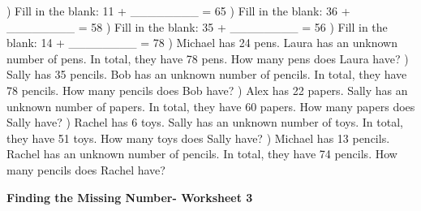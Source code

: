 \documentclass{article}%
\begin{document}
\newline%
\newline%
) Fill in the blank: 11 + \_\_\_\_\_\_\_\_ = 65%
\newline%
\newline%
) Fill in the blank: 36 + \_\_\_\_\_\_\_\_ = 58%
\newline%
\newline%
) Fill in the blank: 35 + \_\_\_\_\_\_\_\_ = 56%
\newline%
\newline%
) Fill in the blank: 14 + \_\_\_\_\_\_\_\_ = 78%
\newline%
\newline%
) Michael has 24 pens. Laura has an unknown number of pens. In total, they have 78 pens. How many pens does Laura have?%
\newline%
\newline%
) Sally has 35 pencils. Bob has an unknown number of pencils. In total, they have 78 pencils. How many pencils does Bob have?%
\newline%
\newline%
) Alex has 22 papers. Sally has an unknown number of papers. In total, they have 60 papers. How many papers does Sally have?%
\newline%
\newline%
) Rachel has 6 toys. Sally has an unknown number of toys. In total, they have 51 toys. How many toys does Sally have?%
\newline%
\newline%
) Michael has 13 pencils. Rachel has an unknown number of pencils. In total, they have 74 pencils. How many pencils does Rachel have?%
\newline%
\newline%
\newline%
\pagebreak%
\large%
\begin{center}%
\textbf{Finding the Missing Number- Worksheet 3}%
\newline%
\newline%
\newline%
\end{center} \normalsize%
\end{document}
